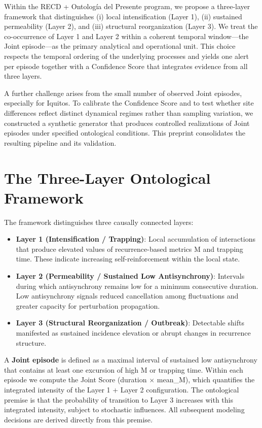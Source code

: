 \documentclass[11pt,a4paper]{article}
\begin{document}
Within the RECD + Ontología del Presente program, we propose a three-layer framework that distinguishes (i) local intensification (Layer 1), (ii) sustained permeability (Layer 2), and (iii) structural reorganization (Layer 3). We treat the co-occurrence of Layer 1 and Layer 2 within a coherent temporal window—the Joint episode—as the primary analytical and operational unit. This choice respects the temporal ordering of the underlying processes and yields one alert per episode together with a Confidence Score that integrates evidence from all three layers.

A further challenge arises from the small number of observed Joint episodes, especially for Iquitos. To calibrate the Confidence Score and to test whether site differences reflect distinct dynamical regimes rather than sampling variation, we constructed a synthetic generator that produces controlled realizations of Joint episodes under specified ontological conditions. This preprint consolidates the resulting pipeline and its validation.

\section{The Three-Layer Ontological Framework}

The framework distinguishes three causally connected layers:

\begin{itemize}
    \item \textbf{Layer 1 (Intensification / Trapping)}: Local accumulation of interactions that produce elevated values of recurrence-based metrics M and trapping time. These indicate increasing self-reinforcement within the local state.
    \item \textbf{Layer 2 (Permeability / Sustained Low Antisynchrony)}: Intervals during which antisynchrony remains low for a minimum consecutive duration. Low antisynchrony signals reduced cancellation among fluctuations and greater capacity for perturbation propagation.
    \item \textbf{Layer 3 (Structural Reorganization / Outbreak)}: Detectable shifts manifested as sustained incidence elevation or abrupt changes in recurrence structure.
\end{itemize}

A \textbf{Joint episode} is defined as a maximal interval of sustained low antisynchrony that contains at least one excursion of high M or trapping time. Within each episode we compute the Joint Score (duration $\times$ mean\_M), which quantifies the integrated intensity of the Layer 1 + Layer 2 configuration. The ontological premise is that the probability of transition to Layer 3 increases with this integrated intensity, subject to stochastic influences. All subsequent modeling decisions are derived directly from this premise.
\end{document}
